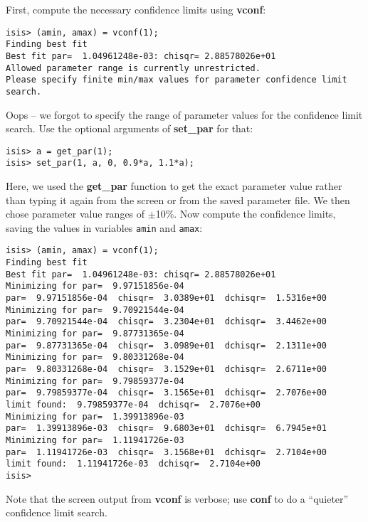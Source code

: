 \documentclass{book}
\begin{document}
First, compute the necessary confidence limits using {\bf vconf}:
\begin{verbatim}
isis> (amin, amax) = vconf(1);
Finding best fit
Best fit par=  1.04961248e-03: chisqr= 2.88578026e+01
Allowed parameter range is currently unrestricted.
Please specify finite min/max values for parameter confidence limit search.
\end{verbatim}
Oops -- we forgot to specify the range of parameter values for the
confidence limit search. Use the optional arguments of {\bf
set\_par} for that:
\begin{verbatim}
isis> a = get_par(1);
isis> set_par(1, a, 0, 0.9*a, 1.1*a);
\end{verbatim}
Here, we used the {\bf get\_par} function to get the exact parameter value rather
than typing it again from the screen or from the saved parameter file.  We then
chose parameter value ranges of $\pm$10\%.  Now compute the
confidence limits, saving the values in variables {\tt amin} and {\tt amax}:
\begin{verbatim}
isis> (amin, amax) = vconf(1);
Finding best fit
Best fit par=  1.04961248e-03: chisqr= 2.88578026e+01
Minimizing for par=  9.97151856e-04
par=  9.97151856e-04  chisqr=  3.0389e+01  dchisqr=  1.5316e+00
Minimizing for par=  9.70921544e-04
par=  9.70921544e-04  chisqr=  3.2304e+01  dchisqr=  3.4462e+00
Minimizing for par=  9.87731365e-04
par=  9.87731365e-04  chisqr=  3.0989e+01  dchisqr=  2.1311e+00
Minimizing for par=  9.80331268e-04
par=  9.80331268e-04  chisqr=  3.1529e+01  dchisqr=  2.6711e+00
Minimizing for par=  9.79859377e-04
par=  9.79859377e-04  chisqr=  3.1565e+01  dchisqr=  2.7076e+00
limit found:  9.79859377e-04  dchisqr=  2.7076e+00
Minimizing for par=  1.39913896e-03
par=  1.39913896e-03  chisqr=  9.6803e+01  dchisqr=  6.7945e+01
Minimizing for par=  1.11941726e-03
par=  1.11941726e-03  chisqr=  3.1568e+01  dchisqr=  2.7104e+00
limit found:  1.11941726e-03  dchisqr=  2.7104e+00
isis>
\end{verbatim}
Note that the screen output from {\bf vconf} is verbose;
use {\bf conf} to do a ``quieter'' confidence limit search.
\end{document}
